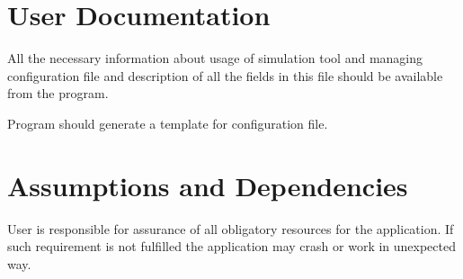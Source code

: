 \section{User Documentation}

	{
		All the necessary information about usage of simulation tool and managing configuration file and description of all the fields in this file should be available from the program.   
	}
	
	{
		Program should generate a template for configuration file.   
	}
\section{Assumptions and Dependencies}

	
	{
		User is responsible for assurance of all obligatory resources for the application. If such requirement is not fulfilled the application may crash or work in unexpected way.
	}
